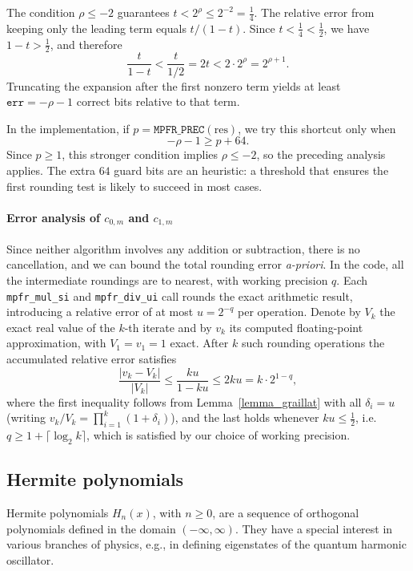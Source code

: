 \documentclass[12pt]{amsart}
\begin{document}
The condition $\rho \le -2$ guarantees
$t < 2^\rho \le 2^{-2} = \tfrac{1}{4}$.
The relative error from keeping only the leading term equals $t/(1-t)$.
Since $t < \tfrac{1}{4} < \tfrac{1}{2}$, we have $1 - t > \tfrac{1}{2}$,
and therefore
\[
  \frac{t}{1-t} < \frac{t}{1/2} = 2t < 2 \cdot 2^\rho = 2^{\rho+1}.
\]
Truncating the expansion after the first nonzero term yields at least
$\mathtt{err} = -\rho - 1$ correct bits relative to that term.

In the implementation, if $p = \texttt{MPFR\_PREC}(\mathrm{res})$, we try this
shortcut only when
\[
  -\rho - 1 \ge p + 64.
\]
Since $p \ge 1$, this stronger condition implies $\rho \le -2$, so the
preceding analysis applies. The extra $64$ guard bits are an heuristic:
a threshold that ensures the first rounding test is likely to succeed
in most cases.

\paragraph{\textbf{Error analysis of $c_{0,m}$ and $c_{1,m}$}}
\label{par:legendre-error-analysis}

Since neither algorithm involves any addition or subtraction, there is no
cancellation, and we can bound the total rounding error \textit{a-priori}.
In the code, all the intermediate roundings are to nearest, with working
precision $q$. Each \texttt{mpfr\_mul\_si} and \texttt{mpfr\_div\_ui} call
rounds the exact arithmetic result, introducing a relative error of at most
$u = 2^{-q}$ per operation. Denote by $V_k$ the exact real value of the
$k$-th iterate and by $v_k$ its computed floating-point approximation, with
$V_1 = v_1 = 1$ exact. After $k$ such rounding operations the accumulated
relative error satisfies
\[
  \frac{|v_k - V_k|}{|V_k|}
  \le \frac{ku}{1-ku}
  \le 2ku = k \cdot 2^{1-q},
\]
where the first inequality follows from Lemma~\ref{lemma_graillat} with all
$\delta_i = u$ (writing $v_k/V_k = \prod_{i=1}^k(1+\delta_i)$), and the last
holds whenever $ku \le \tfrac{1}{2}$, i.e. $q \ge 1 + \lceil\log_2 k\rceil$,
which is satisfied by our choice of working precision.

\subsection{Hermite polynomials}

Hermite polynomials $H_n(x)$, with $n \geq 0$, are a sequence of orthogonal
polynomials defined in the domain $(-\infty,\infty)$. They have a special
interest in various branches of physics, e.g., in defining eigenstates
of the quantum harmonic oscillator.
\end{document}
